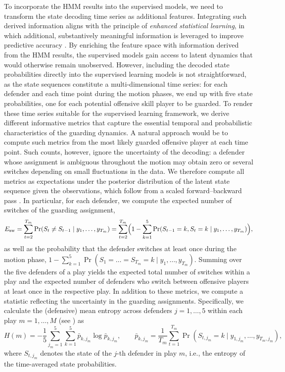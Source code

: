 \documentclass[namedate,webpdf,modern,medium]{oup-authoring-template}
\begin{document}
To incorporate the HMM results into the supervised models, we need to transform the state decoding time series as additional features. Integrating such derived information aligns with the principle of \textit{enhanced statistical learning}, in which additional, substantively meaningful information is leveraged to improve predictive accuracy \citep{felice2025boosting}. By enriching the feature space with information derived from the HMM results, the supervised models gain access to latent dynamics that would otherwise remain unobserved. However, including the decoded state probabilities directly into the supervised learning models is not straightforward, as the state sequences constitute a multi-dimensional time series: for each defender and each time point during the motion phases, we end up with five state probabilities, one for each potential offensive skill player to be guarded. %
To render these time series suitable for the supervised
learning framework, we derive different informative metrics that capture the essential temporal
and probabilistic characteristics of the guarding dynamics.
A natural approach would be to compute such metrics from the most likely guarded offensive player at each time point. Such counts, however, ignore the uncertainty of the decoding: a defender whose assignment is ambiguous throughout the motion may obtain zero or several switches depending on small fluctuations in the data. We therefore compute all metrics as expectations under the posterior distribution of the latent state sequence given the observations, which follow from a scaled forward--backward pass \citep{zucchini}.
In particular, for each defender, we compute the expected number of switches of the guarding assignment,
\begin{equation}\label{eq:decod}
E_{\text{sw}} = \sum_{t=2}^{T_m} \Pr(S_t \neq S_{t-1} \mid y_1, \dots, y_{T_m}) = \sum_{t=2}^{T_m} \Bigl(1 - \sum_{k=1}^{5} \Pr(S_{t-1} = k, S_t = k \mid y_1, \dots, y_{T_m})\Bigr),
\end{equation}
as well as the probability that the defender switches at least once during the motion phase, $1 - \sum_{k=1}^{5} \Pr(S_1 = \dots = S_{T_m} = k \mid y_1, \dots, y_{T_m})$. Summing over the five defenders of a play yields the expected total number of switches within a play and the expected number of defenders who switch between offensive players at least once in the respective play.
In addition to these metrics, we compute a statistic reflecting the uncertainty in the guarding assignments. Specifically, we calculate the (defensive) mean entropy across defenders $j = 1, \ldots, 5$ within each play $m = 1, \ldots, M$ (see \citealp{franks2015}) as
\[
H(m) = -\frac{1}{5} \sum_{j_m=1}^{5} \sum_{k=1}^{5} \bar{p}_{k,j_m} \log \bar{p}_{k,j_m}, \qquad \bar{p}_{k,j_m} = \frac{1}{T_m} \sum_{t=1}^{T_m} \Pr(S_{t,j_m} = k \mid y_{1,j_m}, \dots, y_{T_m,j_m}),
\]
where $S_{t,j_m}$ denotes the state of the $j$-th defender in play $m$, i.e., the entropy of the time-averaged state probabilities.
\end{document}
